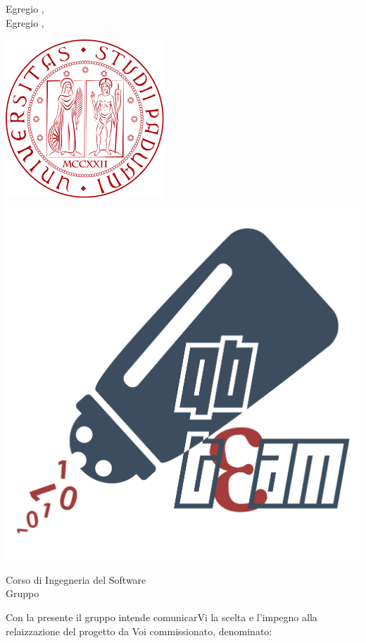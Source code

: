 \documentclass[12pt]{letter}
\begin{document}
    \begin{letter}
        { Egregio \VT{},\\Egregio \CR{},}
        \begin{center}
            \includegraphics[scale=0.5]{../Utilita/Immagini/LogoUniPD.png}
            \includegraphics[scale=0.095]{../Utilita/Immagini/qbteam.png}
        \end{center}
        {
            Corso di Ingegneria del Software\\ Gruppo \Gruppo{}
        }
        \opening{ Con la presente il gruppo \Gruppo{} intende comunicarVi la scelta e l'impegno alla relaizzazione del progetto da Voi commissionato, denominato:}
        \begin{center}
            \NomeProgetto{}

\end{center}
\end{letter}
\end{document}
